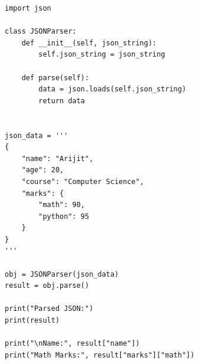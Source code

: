 \begin{verbatim}
import json

class JSONParser:
    def __init__(self, json_string):
        self.json_string = json_string

    def parse(self):
        data = json.loads(self.json_string)
        return data


json_data = '''
{
    "name": "Arijit",
    "age": 20,
    "course": "Computer Science",
    "marks": {
        "math": 90,
        "python": 95
    }
}
'''

obj = JSONParser(json_data)
result = obj.parse()

print("Parsed JSON:")
print(result)

print("\nName:", result["name"])
print("Math Marks:", result["marks"]["math"])
\end{verbatim}